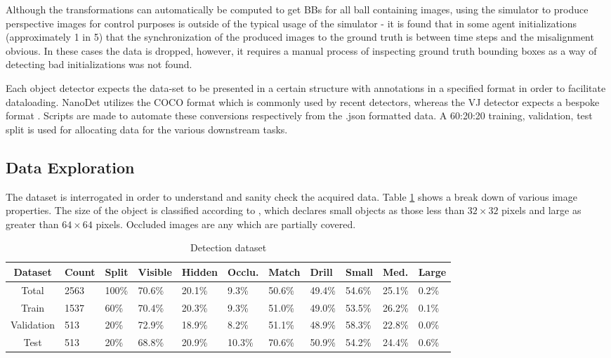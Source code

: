 \documentclass[a4paper,twoside,12pt]{report}
\begin{document}
Although the transformations can automatically be computed to get BBs for all ball containing images, using the simulator to produce perspective images for control purposes is outside of the typical usage of the simulator - it is found that in some agent initializations (approximately 1 in 5) that the synchronization of the produced images to the ground truth is between time steps and the misalignment obvious. In these cases the data is dropped, however, it requires a manual process of inspecting ground truth bounding boxes as a way of detecting bad initializations was not found.

Each object detector expects the data-set to be presented in a certain structure with annotations in a specified format in order to facilitate dataloading. NanoDet utilizes the COCO format \citep{cocodataset} which is commonly used by recent detectors, whereas the VJ detector expects a bespoke format \citep{vjdataset}. Scripts are made to automate these conversions respectively from the .json formatted data. A 60:20:20 training, validation, test split is used for allocating data for the various downstream tasks.

\subsection{Data Exploration}
The dataset is interrogated in order to understand and sanity check the acquired data. Table \ref{tab:detection} shows a break down of various image properties. The size of the object is classified according to \cite{cocoeval}, which declares small objects as those less than $32\times32$ pixels and large as greater than $64\times64$ pixels. Occluded images are any which are partially covered.

\begin{table}[h!]
\fontsize{9.5pt}{12pt}\selectfont
\centering
\begin{tabular}{c|ll|lll|ll|lll}
{\bf Dataset}	&{\bf Count}	&{\bf Split}	&{\bf Visible}	&{\bf Hidden}	&{\bf Occlu.}	&{\bf Match}	&{\bf Drill}	&{\bf Small}	&{\bf Med.}	&{\bf Large}	\\\hline
Total			&2563			&100\%			&70.6\%			&20.1\%			&9.3\%			&50.6\%			&49.4\%			&54.6\%			&25.1\%			&0.2\%			\\\hline   
Train			&1537			&60\%			&70.4\%			&20.3\%			&9.3\%			&51.0\%			&49.0\%			&53.5\%			&26.2\%			&0.1\%			\\\hline  
Validation		&513			&20\%			&72.9\%			&18.9\%			&8.2\%			&51.1\%			&48.9\%			&58.3\%			&22.8\%			&0.0\%			\\\hline  
Test			&513			&20\%			&68.8\%			&20.9\%			&10.3\%			&70.6\%			&50.9\%			&54.2\%			&24.4\%			&0.6\%			\\\hline                        
\end{tabular}
\caption{Detection dataset}
\label{tab:detection}
\end{table}
\end{document}
